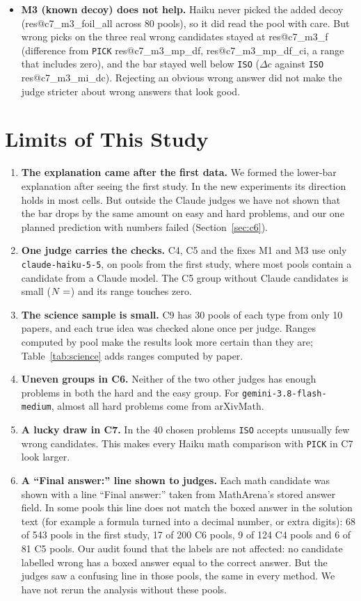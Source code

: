 \documentclass[10pt,twocolumn]{article}
\makeatletter
\newcommand{\res}[1]{\csname res@#1\endcsname}
\makeatother
\begin{document}
\begin{itemize}
\item \textbf{M3 (known decoy) does not help.} Haiku never picked the added decoy (\res{c7_m3_foil_all} across 80 pools), so it did read the pool with care. But wrong picks on the three real wrong candidates stayed at \res{c7_m3_f} (difference from \texttt{PICK} \res{c7_m3_mp_df}, \res{c7_m3_mp_df_ci}, a range that includes zero), and the bar stayed well below \texttt{ISO} ($\Delta c$ against \texttt{ISO} \res{c7_m3_mi_dc}). Rejecting an obvious wrong answer did not make the judge stricter about wrong answers that look good.
\end{itemize}

\section{Limits of This Study}
\begin{enumerate}\setlength{\itemsep}{2pt}
\item \textbf{The explanation came after the first data.} We formed the lower-bar explanation after seeing the first study. In the new experiments its direction holds in most cells. But outside the Claude judges we have not shown that the bar drops by the same amount on easy and hard problems, and our one planned prediction with numbers failed (Section~\ref{sec:c6}).
\item \textbf{One judge carries the checks.} C4, C5 and the fixes M1 and M3 use only \texttt{claude-haiku-5-5}, on pools from the first study, where most pools contain a candidate from a Claude model. The C5 group without Claude candidates is small ($N=\res{c5o_all_cl0_n}$) and its range touches zero.
\item \textbf{The science sample is small.} C9 has 30 pools of each type from only 10 papers, and each true idea was checked alone once per judge. Ranges computed by pool make the results look more certain than they are; Table~\ref{tab:science} adds ranges computed by paper.
\item \textbf{Uneven groups in C6.} Neither of the two other judges has enough problems in both the hard and the easy group. For \texttt{gemini-3.8-flash-medium}, almost all hard problems come from arXivMath.
\item \textbf{A lucky draw in C7.} In the 40 chosen problems \texttt{ISO} accepts unusually few wrong candidates. This makes every Haiku math comparison with \texttt{PICK} in C7 look larger.
\item \textbf{A ``Final answer:'' line shown to judges.} Each math candidate was shown with a line ``Final answer:'' taken from MathArena's stored answer field. In some pools this line does not match the boxed answer in the solution text (for example a formula turned into a decimal number, or extra digits): 68 of 543 pools in the first study, 17 of 200 C6 pools, 9 of 124 C4 pools and 6 of 81 C5 pools. Our audit found that the labels are not affected: no candidate labelled wrong has a boxed answer equal to the correct answer. But the judges saw a confusing line in those pools, the same in every method. We have not rerun the analysis without these pools.

\end{enumerate}
\end{document}
